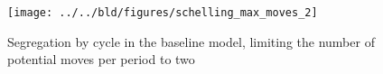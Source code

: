 \documentclass[11pt, a4paper, leqno]{article}
\begin{document}
\begin{figure}
    \caption{Segregation by cycle in the baseline \citet{Schelling69} model, limiting the number of potential moves per period to two}

    \texttt{[image: ../../bld/figures/schelling\_max\_moves\_2]}

\end{figure}





\printbibliography
{}





\end{document}
